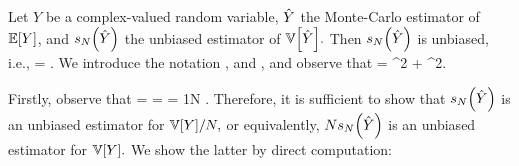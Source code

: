 \label{lem:unbiased}
Let $Y$ be a complex-valued random variable,  $\hat{Y}$ the Monte-Carlo estimator of $\EXP{Y}$, and $\unbiased{\Yhat}{N}$ the unbiased estimator of $\VAR{\Yhat}.$ Then $\unbiased{\Yhat}{N}$ is unbiased, i.e.,
\beqs
{} = \VAR{\Yhat}.
\eeqs
\ele
{}
We introduce the notation
\beqs
\mu \de {},
\eeqs
and
\beqs
\sigma \de {},
\eeqs
and observe that
\beq\label{eq:varrelation}
 = \sigma^2 + \mu^2.
\eeq

Firstly, observe that
\beqs
\VAR{\Yhat} =  =   = \frac1N .
\eeqs
Therefore, it is sufficient to show that $\unbiased{\Yhat}{N}$ is an unbiased estimator for $\VAR{Y}/N,$ or equivalently, $N\unbiased{\Yhat}{N}$ is an unbiased estimator for $\VAR{Y}.$ We show the latter by direct computation:
